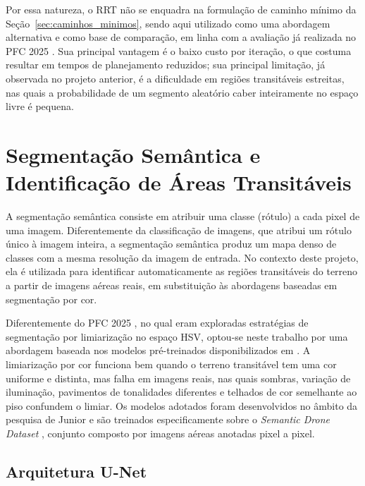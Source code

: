\documentclass[
    12pt,
    openright,
    oneside,
    a4paper,
    english,
    brazil
]{abntex2}
\begin{document}
Por essa natureza, o RRT não se enquadra na formulação de caminho mínimo da Seção~\ref{sec:caminhos_minimos}, sendo aqui utilizado como uma abordagem alternativa e como base de comparação, em linha com a avaliação já realizada no PFC 2025 \cite{camelo2025}. Sua principal vantagem é o baixo custo por iteração, o que costuma resultar em tempos de planejamento reduzidos; sua principal limitação, já observada no projeto anterior, é a dificuldade em regiões transitáveis estreitas, nas quais a probabilidade de um segmento aleatório caber inteiramente no espaço livre é pequena.

\section{Segmentação Semântica e Identificação de Áreas Transitáveis}
\label{sec:segmentacao}

A segmentação semântica consiste em atribuir uma classe (rótulo) a cada pixel de uma imagem. Diferentemente da classificação de imagens, que atribui um rótulo único à imagem inteira, a segmentação semântica produz um mapa denso de classes com a mesma resolução da imagem de entrada. No contexto deste projeto, ela é utilizada para identificar automaticamente as regiões transitáveis do terreno a partir de imagens aéreas reais, em substituição às abordagens baseadas em segmentação por cor.

Diferentemente do PFC 2025 \cite{camelo2025}, no qual eram exploradas estratégias de segmentação por limiarização no espaço HSV, optou-se neste trabalho por uma abordagem baseada nos modelos pré-treinados disponibilizados em \cite{junior2024_models}. A limiarização por cor funciona bem quando o terreno transitável tem uma cor uniforme e distinta, mas falha em imagens reais, nas quais sombras, variação de iluminação, pavimentos de tonalidades diferentes e telhados de cor semelhante ao piso confundem o limiar. Os modelos adotados foram desenvolvidos no âmbito da pesquisa de Junior \cite{junior2024} e são treinados especificamente sobre o \emph{Semantic Drone Dataset} \cite{drone_dataset}, conjunto composto por imagens aéreas anotadas pixel a pixel.

\subsection{Arquitetura U-Net}
\end{document}
